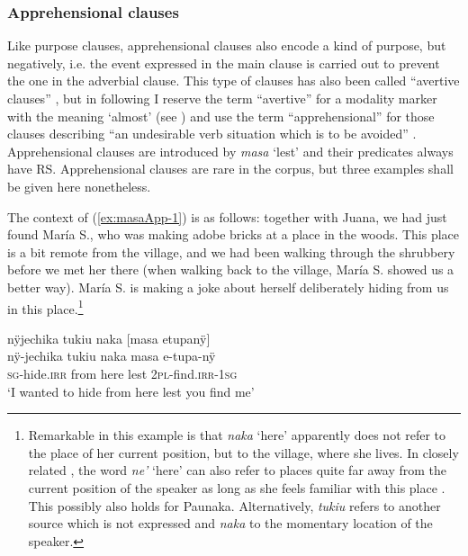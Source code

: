 \subsubsection{Apprehensional clauses}\label{sec:AprenhensionalClauses}

Like purpose clauses, apprehensional clauses also encode a kind of purpose, but negatively, i.e. the event expressed in the main clause is carried out to prevent the one in the adverbial clause. This type of clauses has also been called “avertive clauses” \citep[e.g.][]{SchmidtkeBode2009}, but in following \citet[]{Kuteva2019} I reserve the term “avertive” for a modality marker with the meaning ‘almost’ (see ) and use the term “apprehensional” for those clauses describing “an undesirable verb situation which is to be avoided” \citep[863]{Kuteva2019}. Apprehensional clauses are introduced by \textit{masa} ‘lest’ and their predicates always have  RS. Apprehensional clauses are rare in the corpus, but three examples shall be given here nonetheless.

The context of (\ref{ex:masaApp-1}) is as follows: together with Juana, we had just found María S., who was making adobe bricks at a place in the woods. This place is a bit remote from the village, and we had been walking through the shrubbery before we met her there (when walking back to the village, María S. showed us a better way). María S. is making a joke about herself deliberately hiding from us in this place.\footnote{Remarkable in this example is that \textit{naka} ‘here’ apparently does not refer to the place of her current position, but to the village, where she lives. In closely related , the word \textit{ne’} ‘here’ can also refer to places quite far away from the current position of the speaker as long as she feels familiar with this place \citep[252--254]{Admiraal2016}. This possibly also holds for Paunaka. Alternatively, \textit{tukiu} refers to another source which is not expressed and \textit{naka} to the momentary location of the speaker.}

\ea\label{ex:masaApp-1}
\begingl
\glpreamble nÿjechika tukiu naka \textup{[}masa etupanÿ\textup{]}\\
\gla nÿ-jechika tukiu naka masa e-tupa-nÿ\\
\textsc{sg}-hide.\textsc{irr} from here lest 2\textsc{pl}-find.\textsc{irr}-1\textsc{sg}\\
\glft ‘I wanted to hide from here lest you find me’
\endgl
{}
\xe


